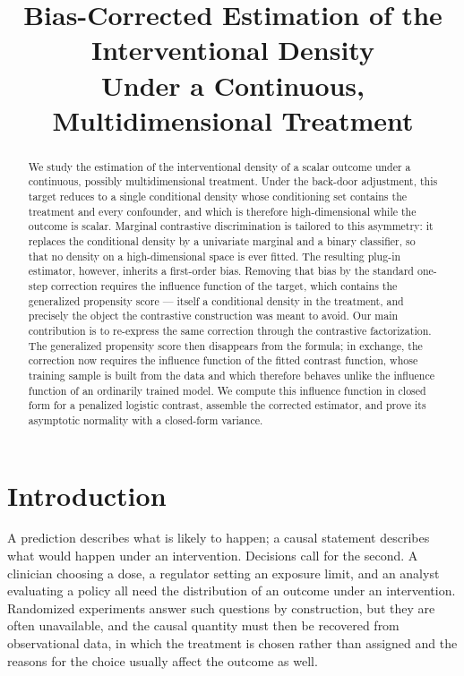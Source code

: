 \documentclass[11pt]{article}
\title{Bias-Corrected Estimation of the Interventional Density\\
Under a Continuous, Multidimensional Treatment}
\author{}
\date{}
\theoremstyle{plain}
\theoremstyle{definition}
\theoremstyle{remark}
\begin{document}
\maketitle

\begin{abstract}
We study the estimation of the interventional density of a scalar outcome under a
continuous, possibly multidimensional treatment. Under the back-door adjustment, this
target reduces to a single conditional density whose conditioning set contains the
treatment and every confounder, and which is therefore high-dimensional while the outcome
is scalar. Marginal contrastive discrimination is tailored to this asymmetry: it replaces
the conditional density by a univariate marginal and a binary classifier, so that no
density on a high-dimensional space is ever fitted. The resulting plug-in estimator,
however, inherits a first-order bias. Removing that bias by the standard one-step
correction requires the influence function of the target, which contains the generalized
propensity score --- itself a conditional density in the treatment, and precisely the
object the contrastive construction was meant to avoid. Our main contribution is to
re-express the same correction through the contrastive factorization. The generalized
propensity score then disappears from the formula; in exchange, the correction now requires
the influence function of the fitted contrast function, whose training sample is built from
the data and which therefore behaves unlike the influence function of an ordinarily trained
model. We compute this influence function in closed form for a penalized logistic contrast,
assemble the corrected estimator, and prove its asymptotic normality with a closed-form
variance.
\end{abstract}

\section{Introduction}
\label{sec:intro}

A prediction describes what is likely to happen; a causal statement describes what would
happen under an intervention. Decisions call for the second. A clinician choosing a dose, a
regulator setting an exposure limit, and an analyst evaluating a policy all need the
distribution of an outcome under an intervention. Randomized experiments answer such
questions by construction, but they are often unavailable, and the causal quantity must then
be recovered from observational data, in which the treatment is chosen rather than assigned
and the reasons for the choice usually affect the outcome as well.
\end{document}
